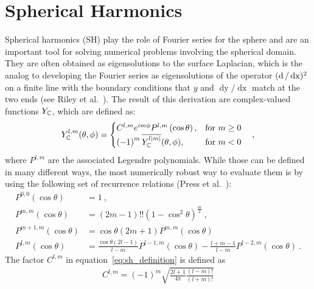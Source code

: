 \section{Spherical Harmonics}
\label{sec:sh}

Spherical harmonics (SH) play the role of Fourier series for the sphere and are an important tool for solving numerical problems involving the spherical domain. They are often obtained as eigensolutions to the surface Laplacian, which is the analog to developing the Fourier series as eigensolutions of the operator $(\operatorname{d}/\operatorname{dx})^2$ on a finite line with the boundary conditions that $y$ and $\operatorname{dy}/\operatorname{dx}$ match at the two ends (see Riley et al.~\cite{Riley2006}). The result of this derivation are complex-valued functions $Y_{\mathbb{C}}$, which are defined as:
\begin{align}
\label{eq:sh_definition}
Y_{\mathbb{C}}^{l,m}(\theta, \phi)=
\begin{cases}
C^{l,m}e^{im\phi}P^{l,m}\left(\operatorname{cos}\theta\right), & \text{for $m\ge0$}\\
\left(-1\right)^m\overline{Y_{\mathbb{C}}^{l\left|m\right|}}(\theta, \phi), & \text{for $m<0$}
\end{cases}
\quad ,
\end{align}
where $P^{l,m}$ are the associated Legendre polynomials. While those can be defined in many different ways, the most numerically robust way to evaluate them is by using the following set of recurrence relations (Press et al.~\cite{Press07}):
\begin{align}
P^{0,0}\left(\operatorname{cos}\theta\right) &=
1
\  ,
\nonumber
\\
P^{m,m}\left(\operatorname{cos}\theta\right) &=
\left(2m-1\right)!!\left(1-\operatorname{cos}^2\theta\right)^\frac{m}{2}
\  ,
\nonumber
\\
P^{m+1,m}\left(\operatorname{cos}\theta\right) &=
\operatorname{cos}\theta\left(2m+1\right)P^{m,m}\left(\operatorname{cos}\theta\right)
\ 
\nonumber
\\
P^{l,m}\left(\operatorname{cos}\theta\right) &=
\frac{\operatorname{cos}\theta\left(2l-1\right)}{l-m}
P^{l-1,m}\left(\operatorname{cos}\theta\right)
-
\frac{l+m-1}{l-m}
P^{l-2,m}\left(\operatorname{cos}\theta\right)
\  .
\label{eq:sh_Plm}
\end{align}
The factor $C^{l,m}$ in equation~\ref{eq:sh_definition} is defined as
\begin{align}
\label{eq:sh_definition_C}
C^{l,m}=(-1)^m\sqrt{\frac{2l+1}{4\pi}\frac{(l-m)!}{(l+m)!}}
\end{align}

